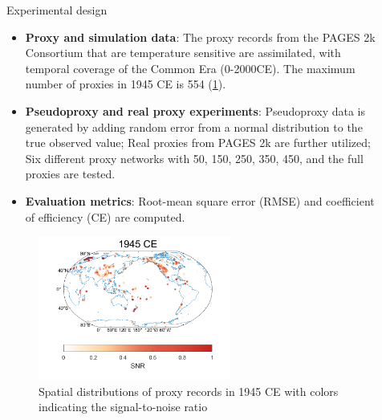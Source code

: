 \documentclass[final]{beamer}
\newlength{\sepwidth}
\newlength{\colwidth}
\newcommand{\separatorcolumn}{\begin{column}{\sepwidth}\end{column}}
\begin{document}
\begin{frame}[t]
\begin{columns}[t]
\begin{column}{\colwidth}
    			\begin{block}{Experimental design}			
                    \begin{itemize}
                        \item \textbf{Proxy and simulation data}: The proxy records from the PAGES 2k Consortium \parencite{pages2k_consortium_global_2017} that are temperature sensitive are assimilated, with temporal coverage of the Common Era (0-2000CE). The maximum number of proxies in 1945 CE is 554 (\cref{fig2}).
                        \item \textbf{Pseudoproxy and real proxy experiments}: Pseudoproxy data is generated by adding random error from a normal distribution to the true observed value; Real proxies from PAGES 2k are further utilized; Six different proxy networks with 50, 150, 250, 350, 450, and the full proxies are tested.  
                        \item \textbf{Evaluation metrics}: Root-mean square error (RMSE) and coefficient of efficiency (CE) are computed.        
                    \end{itemize}
    
                    \begin{figure}
                        \begin{minipage}[t]{0.8\textwidth}
                            \centerline{\includegraphics[width=0.625\textwidth]{figure/Figure2.png}}
                            \caption{Spatial distributions of proxy records in 1945 CE with colors indicating the signal-to-noise ratio}\label{fig2}
                        \end{minipage}
                    \end{figure}	
    			\end{block}
    
    		\end{column}	
    		\separatorcolumn	
    		\begin{column}{\colwidth}
    			

\end{column}
\end{columns}
\end{frame}
\end{document}
